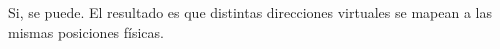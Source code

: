 Si, se puede. El resultado es que distintas direcciones virtuales se mapean a las mismas posiciones físicas.

